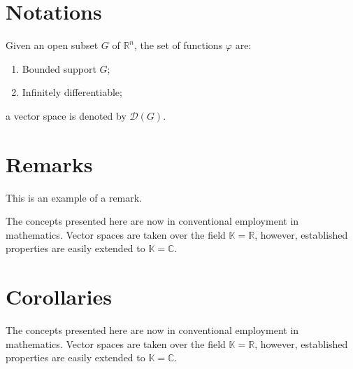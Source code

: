 \documentclass[
	11pt,
	fleqn,
	a4paper,
]{LegrandOrangeBook}
\begin{document}

\section{Notations}

\begin{notation} %
    Given an open subset $G$ of $\mathbb{R}^n$, the set of functions $\varphi$ are:
    \begin{enumerate}
        \item Bounded support $G$;
        \item Infinitely differentiable;
    \end{enumerate}
    a vector space is denoted by $\mathcal{D}(G)$.
\end{notation}


\section{Remarks}

This is an example of a remark.

\begin{remark}
    The concepts presented here are now in conventional employment in mathematics. Vector spaces are taken over the field $\mathbb{K}=\mathbb{R}$, however, established properties are easily extended to $\mathbb{K}=\mathbb{C}$.
\end{remark}


\section{Corollaries}

\begin{corollary}[Corollary name] %
    The concepts presented here are now in conventional employment in mathematics. Vector spaces are taken over the field $\mathbb{K}=\mathbb{R}$, however, established properties are easily extended to $\mathbb{K}=\mathbb{C}$.
\end{corollary}

\end{document}
